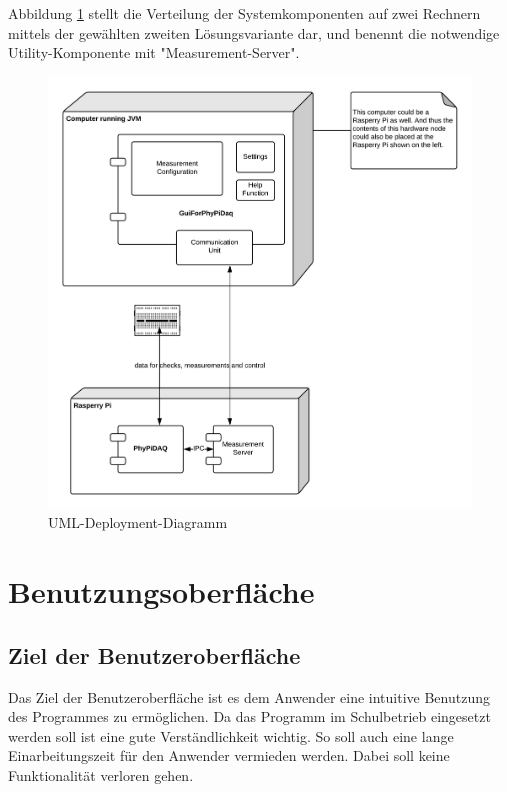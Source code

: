 \documentclass[parskip=full]{scrartcl}
\begin{document}
Abbildung \ref{DeploymentDiagram} stellt die Verteilung der Systemkomponenten auf zwei Rechnern mittels der gewählten zweiten Lösungsvariante dar, und benennt die notwendige Utility-Komponente mit "Measurement-Server". 
 

\begin{figure}[h]
	\begin{center}
		\includegraphics[width = 12cm]{Grafik/DeploymentDiagram.png}
		\caption{UML-Deployment-Diagramm}
		\label{DeploymentDiagram}
	\end{center}
\end{figure}

\section{Benutzungsoberfläche}\label{gui}

\subsection{Ziel der Benutzeroberfläche}

Das Ziel der Benutzeroberfläche ist es dem Anwender eine intuitive Benutzung des Programmes zu ermöglichen. Da das Programm im Schulbetrieb eingesetzt werden soll ist eine gute Verständlichkeit wichtig. So soll auch eine lange Einarbeitungszeit für den Anwender vermieden werden. Dabei soll keine Funktionalität verloren gehen.
\end{document}
